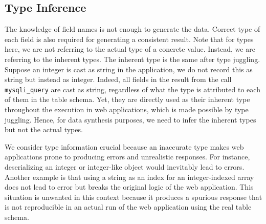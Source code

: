 \documentclass[10pt,conference]{IEEEtran}
\begin{document}
\subsection{Type Inference}


The knowledge of field names is not enough to generate the data. Correct type of each field is also required for generating a consistent result. Note that for types here, we are not referring to the actual type of a concrete value. Instead, we are referring to the inherent types. The inherent type is the same after type juggling. Suppose an integer is cast as string in the application, we do not record this as string but instead as integer. Indeed, all fields in the result from the call \verb|mysqli_query| are cast as string, regardless of what the type is attributed to each of them in the table schema. Yet, they are directly used as their inherent type throughout the execution in web applications, which is made possible by type juggling. Hence, for data synthesis purposes, we need to infer the inherent types but not the actual types.

We consider type information crucial because an inaccurate type makes web applications prone to producing errors and unrealistic responses. For instance, deserializing an integer or integer-like object would inevitably lead to errors. Another example is that using a string as an index for an integer-indexed array does not lead to error but breaks the original logic of the web application. This situation is unwanted in this context because it produces a spurious response that is not reproducible in an actual run of the web application using the real table schema. 

\end{document}
